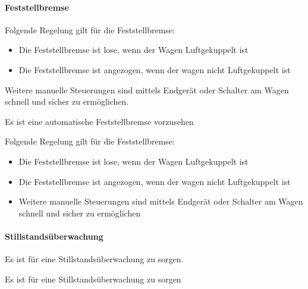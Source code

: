 \paragraph{Feststellbremse}\par
Folgende Regelung gilt für die Feststellbremse:
\begin{itemize}
    \item Die Feststellbremse ist lose, wenn der Wagen Luftgekuppelt ist
    \item Die Feststellbremse ist angezogen, wenn der wagen nicht Luftgekuppelt ist
\end{itemize}
Weitere manuelle Steuerungen sind mittels Endgerät oder Schalter am Wagen schnell und sicher zu ermöglichen.
\begin{feat}
Es ist eine automatische Feststellbremse vorzusehen
\end{feat}
\begin{rem}
Folgende Regelung gilt für die Feststellbremse:
\begin{itemize}
    \item Die Feststellbremse ist lose, wenn der Wagen Luftgekuppelt ist
    \item Die Feststellbremse ist angezogen, wenn der wagen nicht Luftgekuppelt ist
    \item Weitere manuelle Steuerungen sind mittels Endgerät oder Schalter am Wagen schnell und sicher zu ermöglichen
\end{itemize}
\end{rem}

\paragraph{Stillstandsüberwachung}\par
Es ist für eine Stillstandsüberwachung zu sorgen.
\begin{feat}
Es ist für eine Stillstandsüberwachung zu sorgen
\end{feat}

